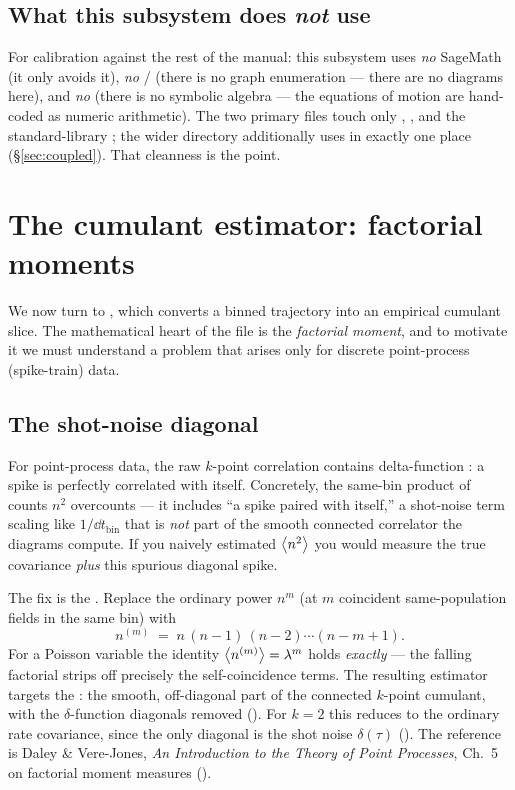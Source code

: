 \subsection{What this subsystem does \emph{not} use}

For calibration against the rest of the manual: this subsystem uses \emph{no}
SageMath (it only avoids it), \emph{no} / (there is no
graph enumeration --- there are no diagrams here), and \emph{no} 
(there is no symbolic algebra --- the equations of motion are hand-coded as numeric
arithmetic). The two primary files touch only , , and the
standard-library ; the wider  directory
additionally uses  in exactly one place
(\S\ref{sec:coupled}). That cleanness is the point.

\section{The cumulant estimator: factorial moments}
\label{sec:factorial}

We now turn to , which converts a binned
trajectory into an empirical cumulant slice. The mathematical heart of the file is
the \emph{factorial moment}, and to motivate it we must understand a problem that
arises only for discrete point-process (spike-train) data.

\subsection{The shot-noise diagonal}

For point-process data, the raw $k$-point correlation contains delta-function
: a spike is perfectly correlated with itself. Concretely, the
same-bin product of counts $n^{2}$ overcounts --- it includes ``a spike paired with
itself,'' a shot-noise term scaling like $1/\dd t_{\mathrm{bin}}$ that is \emph{not}
part of the smooth connected correlator the diagrams compute. If you naively
estimated $\left\langle n^{2} \right\rangle$ you would measure the true covariance \emph{plus} this
spurious diagonal spike.

The fix is the . Replace the ordinary power $n^{m}$ (at $m$
coincident same-population fields in the same bin) with
\begin{equation}
  n^{(m)} \;=\; n\,(n-1)\,(n-2)\cdots(n-m+1).
  \label{eq:falling}
\end{equation}
For a Poisson variable the identity $\left\langle n^{(m)} \right\rangle = \lambda^{m}$ holds
\emph{exactly} --- the falling factorial strips off precisely the self-coincidence
terms. The resulting estimator targets the : the
smooth, off-diagonal part of the connected $k$-point cumulant, with the
$\delta$-function diagonals removed (). For $k=2$
this reduces to the ordinary rate covariance, since the only diagonal is the shot
noise $\delta(\tau)$ (). The reference is Daley
\& Vere-Jones, \emph{An Introduction to the Theory of Point Processes}, Ch.~5 on
factorial moment measures ().

